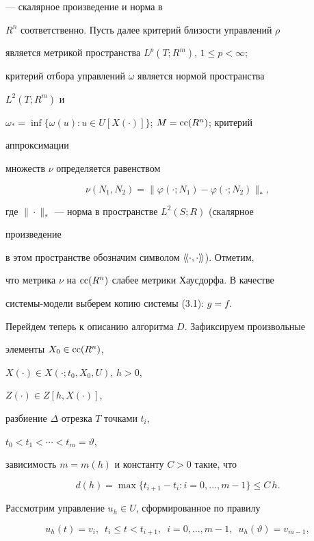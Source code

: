 --- скалярное произведение и норма в 


$R^n$ соответственно. Пусть далее критерий близости управлений $\rho$ 


является метрикой пространства $L^p(T;R^m)$, $1\le p<\infty$; 


критерий отбора управлений $\omega$ является нормой пространства 


$L^2(T;R^m)$ и 


$\omega_*=\inf\{\omega(u):u\in U[X(\cdot)]\}$; $M=\operatorname{cc}(R^n)$; критерий 


аппроксимации 


множеств $\nu$ определяется равенством 


$$ 


\nu(N_1,N_2)=\|\varphi(\cdot;N_1)-\varphi(\cdot;N_2)\|_*, 


$$ 


где $\|\cdot\|_*$ --- норма в пространстве $L^2(S;R)$ (скалярное 


произведение 


в этом пространстве обозначим символом $\langle\!\langle\cdot,\cdot\rangle\!\rangle$). Отметим, 


что метрика $\nu$ на $\operatorname{cc}(R^n)$ слабее метрики Хаусдорфа. В качестве 


системы-модели выберем копию системы (3.1): $g=f$. 


 


Перейдем теперь к описанию алгоритма $D$. Зафиксируем произвольные 


элементы $X_0\in\operatorname{cc}(R^n)$, 


$X(\cdot)\in X(\cdot;t_0,X_0,U)$, $h>0$, 


$Z(\cdot)\in Z[h,X(\cdot)]$, 


разбиение $\Delta$ отрезка $T$ точками $t_i$, 


$t_0<t_1<\dotsb<t_m=\vartheta$, 


зависимость $m=m(h)$ и константу $C>0$ такие, что 


\begin{equation} 


d(h)=\max\{t_{i+1}-t_i:i=0,\dotsc,m-1\}\le C\,h. 


\end{equation} 


Рассмотрим управление $u_h\in U$, сформированное по правилу 


\begin{equation} 


u_h(t)=v_i,\ \; t_i\le t<t_{i+1},\ \; i=0,\dotsc,m-1, 


\ \; u_h(\vartheta)=v_{m-1}, 


\end{equation} 


